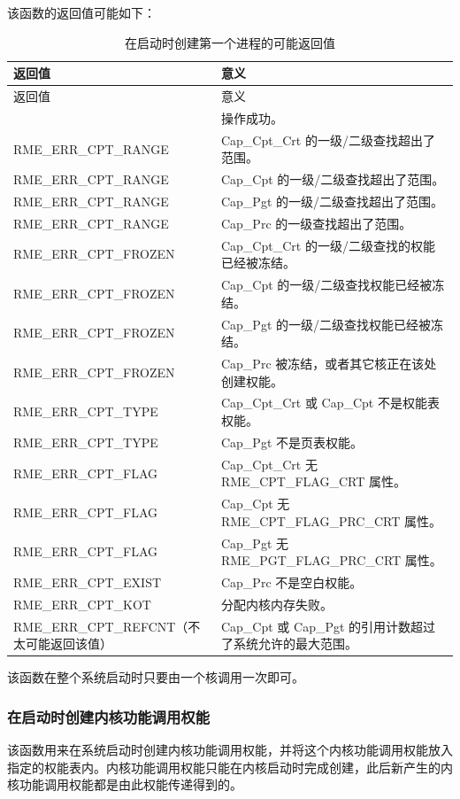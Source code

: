 该函数的返回值可能如下：

\begin{xltabular}{\textwidth}{@{}>{\hsize\raggedright\arraybackslash}X>{\hsize\raggedright\arraybackslash}X@{}}
\caption{在启动时创建第一个进程的可能返回值}\label{tab:7-52-create-first-process-at-boot-return-values}\\
\toprule
返回值 & 意义\tabularnewline
\endfirsthead
\toprule
返回值 & 意义\tabularnewline
\midrule
\endhead
\bottomrule
{} & 操作成功。\tabularnewline
    RME\_ERR\_CPT\_RANGE & Cap\_Cpt\_Crt 的一级/二级查找超出了范围。\tabularnewline
    RME\_ERR\_CPT\_RANGE & Cap\_Cpt 的一级/二级查找超出了范围。\tabularnewline
    RME\_ERR\_CPT\_RANGE & Cap\_Pgt 的一级/二级查找超出了范围。\tabularnewline
    RME\_ERR\_CPT\_RANGE & Cap\_Prc 的一级查找超出了范围。\tabularnewline
    RME\_ERR\_CPT\_FROZEN & Cap\_Cpt\_Crt 的一级/二级查找的权能已经被冻结。\tabularnewline
    RME\_ERR\_CPT\_FROZEN & Cap\_Cpt 的一级/二级查找权能已经被冻结。\tabularnewline
    RME\_ERR\_CPT\_FROZEN & Cap\_Pgt 的一级/二级查找权能已经被冻结。\tabularnewline
    RME\_ERR\_CPT\_FROZEN & Cap\_Prc 被冻结，或者其它核正在该处创建权能。\tabularnewline
    RME\_ERR\_CPT\_TYPE & Cap\_Cpt\_Crt 或 Cap\_Cpt 不是权能表权能。\tabularnewline
    RME\_ERR\_CPT\_TYPE & Cap\_Pgt 不是页表权能。\tabularnewline
    RME\_ERR\_CPT\_FLAG & Cap\_Cpt\_Crt 无 RME\_CPT\_FLAG\_CRT 属性。\tabularnewline
    RME\_ERR\_CPT\_FLAG & Cap\_Cpt 无 RME\_CPT\_FLAG\_PRC\_CRT 属性。\tabularnewline
    RME\_ERR\_CPT\_FLAG & Cap\_Pgt 无 RME\_PGT\_FLAG\_PRC\_CRT 属性。\tabularnewline
    RME\_ERR\_CPT\_EXIST & Cap\_Prc 不是空白权能。\tabularnewline
    RME\_ERR\_CPT\_KOT & 分配内核内存失败。\tabularnewline
    RME\_ERR\_CPT\_REFCNT（不太可能返回该值） & Cap\_Cpt 或 Cap\_Pgt 的引用计数超过了系统允许的最大范围。\tabularnewline
\end{xltabular}

该函数在整个系统启动时只要由一个核调用一次即可。

\subsubsection{在启动时创建内核功能调用权能}\label{subsubsec:7-create-kernel-function-capability-at-boot}

该函数用来在系统启动时创建内核功能调用权能，并将这个内核功能调用权能放入指定的权能表内。内核功能调用权能只能在内核启动时完成创建，此后新产生的内核功能调用权能都是由此权能传递得到的。


